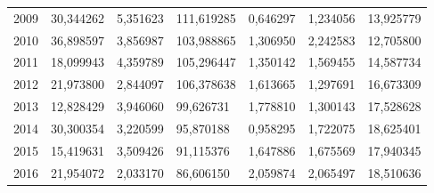 \begin{table}
\begin{tabular}{p{1cm}p{2cm}p{2cm}p{2cm}p{2cm}p{2cm}p{2cm}}
 2009 &                 30,344262 &     5,351623 &                                  111,619285 &               0,646297 &                        1,234056 &                           13,925779 \\
 2010 &                 36,898597 &     3,856987 &                                  103,988865 &               1,306950 &                        2,242583 &                           12,705800 \\
 2011 &                 18,099943 &     4,359789 &                                  105,296447 &               1,350142 &                        1,569455 &                           14,587734 \\
 2012 &                 21,973800 &     2,844097 &                                  106,378638 &               1,613665 &                        1,297691 &                           16,673309 \\
 2013 &                 12,828429 &     3,946060 &                                   99,626731 &               1,778810 &                        1,300143 &                           17,528628 \\
 2014 &                 30,300354 &     3,220599 &                                   95,870188 &               0,958295 &                        1,722075 &                           18,625401 \\
 2015 &                 15,419631 &     3,509426 &                                   91,115376 &               1,647886 &                        1,675569 &                           17,940345 \\
 2016 &                 21,954072 &     2,033170 &                                   86,606150 &               2,059874 &                        2,065497 &                           18,510636 \\
\bottomrule
\end{tabular}
\end{table}
